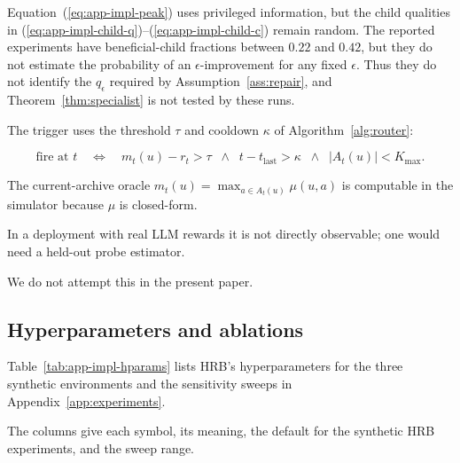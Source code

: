 \documentclass{article} %
\renewcommand{\eqref}[1]{\textup{(\ref{#1})}}
\begin{document}
Equation~\eqref{eq:app-impl-peak} uses privileged information, but the child
qualities in \eqref{eq:app-impl-child-q}--\eqref{eq:app-impl-child-c} remain
random. The reported experiments have beneficial-child fractions between \(0.22\) and
\(0.42\), but they do not estimate the probability of an
\(\epsilon\)-improvement for any fixed \(\epsilon\). Thus they do not identify
the \(q_\epsilon\) required by Assumption~\ref{ass:repair}, and
Theorem~\ref{thm:specialist} is not tested by these runs.

The trigger uses the threshold $\tau$ and cooldown $\kappa$ of
Algorithm~\ref{alg:router}:

\begin{equation}
\label{eq:app-impl-trigger}
\text{fire at } t \quad\Longleftrightarrow\quad m_t(u) - r_t > \tau \;\;\wedge\;\; t - t_{\text{last}} > \kappa \;\;\wedge\;\; |A_t(u)| < K_{\max}.
\end{equation}

The current-archive oracle $m_t(u) = \max_{a \in A_t(u)} \mu(u, a)$ is computable in the simulator because $\mu$ is closed-form.

In a deployment with real LLM rewards it is not directly observable; one would need a held-out probe estimator.

We do not attempt this in the present paper.

\subsection{Hyperparameters and ablations}

\label{app:impl-hparams}

Table~\ref{tab:app-impl-hparams} lists HRB's hyperparameters for the three synthetic environments and the sensitivity sweeps in Appendix~\ref{app:experiments}.

The columns give each symbol, its meaning, the default for the synthetic HRB experiments, and the sweep range.
\end{document}
